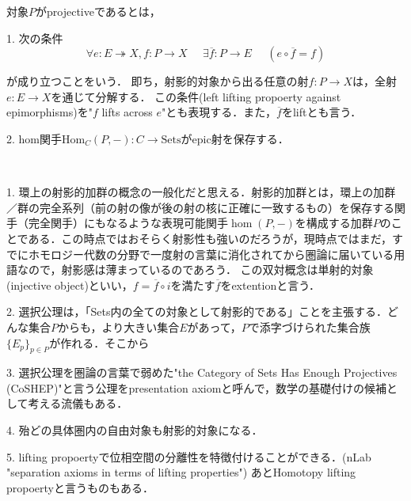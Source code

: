 \documentclass[uplatex, 12pt, dvipdfmx]{jsarticle}
\begin{document}
\begin{definition*}[射影的対象の定義２種]\label{def-projective-object}対象$P$がprojectiveであるとは，

    1. 次の条件
    \[ \forall e:E\twoheadrightarrow X, f:P\to X \;\;\;\;\; \exists \overline{f}:P\to E\;\;\;\;\; (e\circ\overline{f}=f) \]
    \begin{center}
    \end{center}
    が成り立つことをいう．
    即ち，射影的対象から出る任意の射$f:P\to X$は，全射$e:E\to X$を通じて分解する．
    この条件(left lifting propoerty against epimorphisms)を"$f$ lifts across $e$"とも表現する．また，$\overline{f}$をliftとも言う．

    2. hom関手$\mathrm{Hom}_C(P,-):C\to\mathrm{Sets}$がepic射を保存する．
\end{definition*}
\begin{remark*}　
    
    1. 環上の射影的加群の概念の一般化だと思える．射影的加群とは，環上の加群／群の完全系列（前の射の像が後の射の核に正確に一致するもの）を保存する関手（完全関手）にもなるような表現可能関手$\hom(P,-)$を構成する加群$P$のことである．この時点ではおそらく射影性も強いのだろうが，現時点ではまだ，すでにホモロジー代数の分野で一度射の言葉に消化されてから圏論に届いている用語なので，射影感は薄まっているのであろう．
    この双対概念は単射的対象(injective object)といい，$f=\overline{f}\circ i$を満たす$\overline{f}$をextentionと言う．

    2. 選択公理は，「Sets内の全ての対象として射影的である」ことを主張する．どんな集合$P$からも，より大きい集合$E$があって，$P$で添字づけられた集合族$\{E_p\}_{p\in P}$が作れる．そこから

    3. 選択公理を圏論の言葉で弱めた"the Category of Sets Has Enough Projectives (CoSHEP)"と言う公理をpresentation axiomと呼んで，数学の基礎付けの候補として考える流儀もある．
    
    4. 殆どの具体圏内の自由対象も射影的対象になる．

    5. lifting propoertyで位相空間の分離性を特徴付けることができる．(nLab "separation axioms in terms of lifting properties")
    あとHomotopy lifting propoertyと言うものもある．
\end{remark*}
\end{document}
